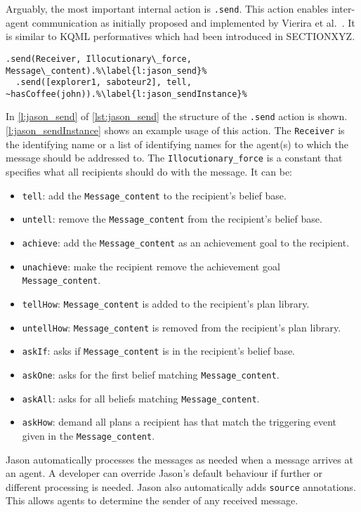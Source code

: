 Arguably, the most important  internal action is \texttt{.send}. This action enables inter-agent communication as initially proposed and implemented by Vierira et al.~\cite{vieira_formal_2007}. It is similar to KQML performatives which had been introduced in SECTIONXYZ. %
\begin{lstlisting}[caption={Parameters of the internal action \texttt{.send} and an example.}, label=lst:jason_send]
  .send(Receiver, Illocutionary\_force, Message\_content).%\label{l:jason_send}%
  .send([explorer1, saboteur2], tell, ~hasCoffee(john)).%\label{l:jason_sendInstance}%
\end{lstlisting}
In \autoref{l:jason_send} of \autoref{lst:jason_send} the structure of the \texttt{.send} action is shown. \autoref{l:jason_sendInstance} shows an example usage of this action. The \texttt{Receiver} is the identifying name or a list of identifying names for the agent(s) to which the message should be addressed to. The \texttt{Illocutionary\_force} is a constant that specifies what all recipients should do with the message. It can be:
\begin{itemize}
  \item \texttt{tell}: add the \texttt{Message\_content} to the recipient's belief base.
  \item \texttt{untell}: remove the \texttt{Message\_content} from the recipient's belief base.
  \item \texttt{achieve}: add the \texttt{Message\_content} as an achievement goal to the recipient.
  \item \texttt{unachieve}: make the recipient remove the achievement goal \texttt{Message\_content}.
  \item \texttt{tellHow}: \texttt{Message\_content} is added to the recipient's plan library.
  \item \texttt{untellHow}: \texttt{Message\_content} is removed from the recipient's plan library.
  \item \texttt{askIf}: asks if \texttt{Message\_content} is in the recipient's belief base.
  \item \texttt{askOne}: asks for the first belief matching \texttt{Message\_content}.
  \item \texttt{askAll}: asks for all beliefs matching \texttt{Message\_content}.
  \item \texttt{askHow}: demand all plans a recipient has that match the triggering event given in the \texttt{Message\_content}.
\end{itemize}
Jason automatically processes the messages as needed when a message arrives at an agent. %
A developer can override Jason's default behaviour if further or different processing is needed. Jason also automatically adds \texttt{source} annotations. This allows agents to determine the sender of any received message.

